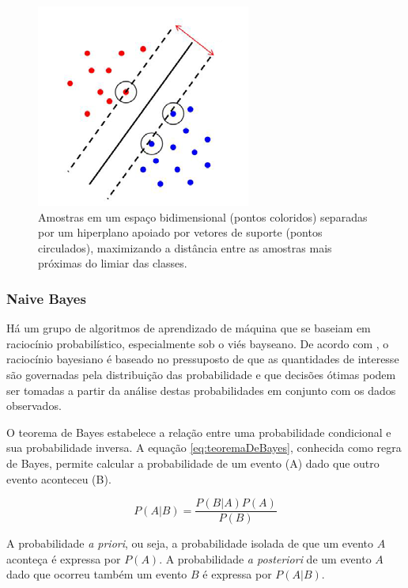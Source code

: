 \begin{figure}[h!]
  \centering
  \includegraphics[scale=0.5]{imgs/svm}
  \caption[Máquina de vetores de suporte]{Amostras em um espaço bidimensional (pontos coloridos) separadas por um hiperplano apoiado por vetores de suporte (pontos circulados), maximizando a distância entre as amostras mais próximas do limiar das classes.}
  \label{fig:svm}
\end{figure}

\subsubsection*{Naive Bayes}

Há um grupo de algoritmos de aprendizado de máquina que se baseiam em raciocínio probabilístico, especialmente sob o viés bayseano. De acordo com , o raciocínio bayesiano é baseado no pressuposto de que as quantidades de interesse são governadas pela distribuição das probabilidade e que decisões ótimas podem ser tomadas a partir da análise destas probabilidades em conjunto com os dados observados.

O teorema de Bayes estabelece a relação entre uma probabilidade condicional e sua probabilidade inversa. A equação \ref{eq:teoremaDeBayes}, conhecida como regra de Bayes, permite calcular a probabilidade de um evento (A) dado que outro evento aconteceu (B).

\begin{equation}
	\displaystyle P(A|B) = \frac{P(B|A) P(A)}{P(B)}
\label{eq:teoremaDeBayes}
\end{equation}

A probabilidade \textit{a priori}, ou seja, a probabilidade isolada de que um evento $A$ aconteça é expressa por $P(A)$. A probabilidade \textit{a posteriori} de um evento $A$ dado que ocorreu também um evento $B$ é expressa por $P(A|B)$.


